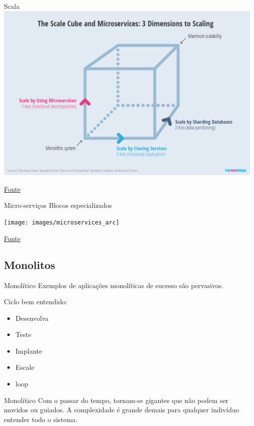 \begin{frame}{Scala}
\includegraphics[width=\textheight]{images/microservices_scale}

\href{https://thenewstack.io/from-monolith-to-microservices/}{Fonte}
\end{frame}



\begin{frame}{Micro-serviços}
Blocos especializados

\texttt{[image: images/microservices\_arc]}

\href{http://nodexperts.com/blog/microservice-vs-monolithic/}{Fonte}
\end{frame}


\subsection{Monolitos}
\begin{frame}{Monolítico}
Exemplos de aplicações monolíticas de sucesso são pervasivos.

\pause Ciclo bem entendido:
\begin{itemize}
	\item Desenvolva
	\item Teste
	\item Implante
	\item Escale
	\item loop
\end{itemize}
\end{frame}


\begin{frame}{Monolítico}
Com o passar do tempo, tornam-se gigantes que não podem ser movidos ou guiados. A complexidade é grande demais para qualquer indivíduo entender todo o sistema.
\end{frame}

